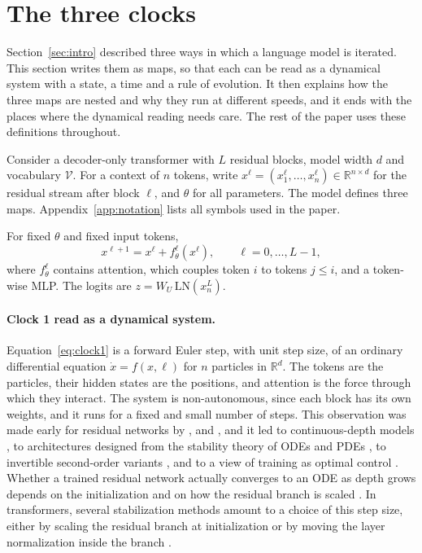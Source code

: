 \section{The three clocks}
\label{sec:maps}
\label{sec:primer}

Section~\ref{sec:intro} described three ways in which a language model is iterated. This section writes them as maps, so that each can be read as a dynamical system with a state, a time and a rule of evolution. It then explains how the three maps are nested and why they run at different speeds, and it ends with the places where the dynamical reading needs care. The rest of the paper uses these definitions throughout.

Consider a decoder-only transformer \citep{vaswani2017attention} with $L$ residual blocks, model width $d$ and vocabulary $\mathcal{V}$. For a context of $n$ tokens, write $x^{\ell}=(x^{\ell}_1,\dots,x^{\ell}_n)\in\mathbb{R}^{n\times d}$ for the residual stream after block $\ell$, and $\theta$ for all parameters. The model defines three maps. Appendix~\ref{app:notation} lists all symbols used in the paper.

\begin{definition}
\label{def:clock1}
For fixed $\theta$ and fixed input tokens,
\begin{equation}
x^{\ell+1} = x^{\ell} + f^{\ell}_{\theta}(x^{\ell}), \qquad \ell = 0,\dots,L-1,
\label{eq:clock1}
\end{equation}
where $f^{\ell}_\theta$ contains attention, which couples token $i$ to tokens $j\le i$, and a token-wise MLP. The logits are $z = W_U\, \mathrm{LN}(x^{L}_n)$.
\end{definition}

\paragraph{Clock 1 read as a dynamical system.} Equation~\eqref{eq:clock1} is a forward Euler step, with unit step size, of an ordinary differential equation $\dot x = f(x,\ell)$ for $n$ particles in $\mathbb{R}^d$. The tokens are the particles, their hidden states are the positions, and attention is the force through which they interact. The system is non-autonomous, since each block has its own weights, and it runs for a fixed and small number of steps. This observation was made early for residual networks \citep{he2015deep} by \citet{e2017proposal}, \citet{haber2017stable} and \citet{lu2017finite}, and it led to continuous-depth models \citep{chen2018neural}, to architectures designed from the stability theory of ODEs and PDEs \citep{haber2017stable,ruthotto2018deep,chang2019antisymmetricrnn}, to invertible second-order variants \citep{sander2021momentum}, and to a view of training as optimal control \citep{e2018meanfield}. Whether a trained residual network actually converges to an ODE as depth grows depends on the initialization and on how the residual branch is scaled \citep{sander2022residual}. In transformers, several stabilization methods amount to a choice of this step size, either by scaling the residual branch at initialization \citep{bachlechner2020rezero,wang2022deepnet} or by moving the layer normalization inside the branch \citep{xiong2020layer,liu2020difficulty}.


